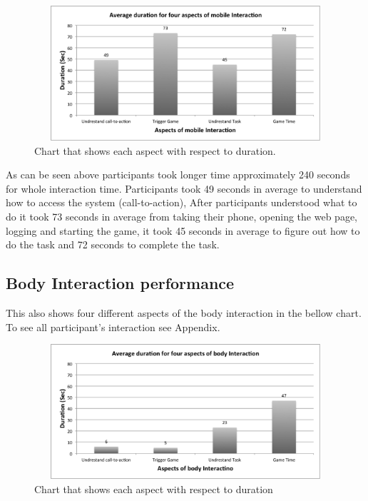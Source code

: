 \begin{figure}[H]
\centering
\includegraphics[width=12cm,height=5cm]{Figures/6/mobile_average}%
 \caption{Chart that shows each aspect with respect to duration. }%
 \label{fig:mobile_average}%
\end{figure}

As can be seen above participants took longer time approximately 240 seconds for whole interaction time. Participants took 49 seconds in average to understand how to access the system (call-to-action), After participants understood what to do it took 73 seconds in average from taking their phone, opening the web page, logging and starting the game, it took 45 seconds in average to figure out how to do the task and 72 seconds to complete the task.

%


\subsection{Body Interaction performance}
This also shows four different aspects of the body interaction in the bellow chart. To see all participant's interaction see Appendix. 

\begin{figure}[H]
\centering
\includegraphics[width=12cm,height=5cm]{Figures/6/body_average}%
 \caption{Chart that shows each aspect with respect to duration}%
 \label{fig:body_average}%
\end{figure}

